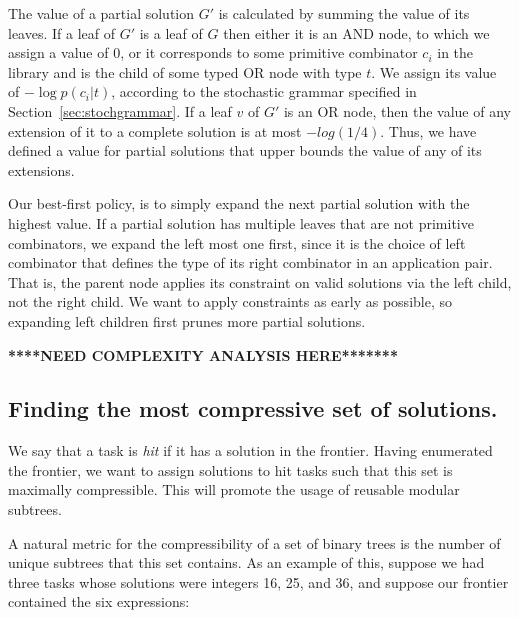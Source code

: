 \documentclass{article}
\begin{document}
The value of a partial solution $G'$ is calculated by summing the
value of its leaves. If a leaf of $G'$ is a leaf of $G$ then either it
is an AND node, to which we assign a value of 0, or it corresponds to
some primitive combinator $c_i$ in the library and is the child of
some typed OR node with type $t$. We assign its value of $- \log{p(c_i
  | t)}$, according to the stochastic grammar specified in
Section~\ref{sec:stochgrammar}. If a leaf $v$ of $G'$ is an OR node,
then the value of any extension of it to a complete solution is at
most $-log(1/4)$. Thus, we have defined a value for partial solutions
that upper bounds the value of any of its extensions. 

Our best-first policy, is to simply expand the next partial solution
with the highest value. If a partial solution has multiple leaves that
are not primitive combinators, we expand the left most one first,
since it is the choice of left combinator that defines the type of its
right combinator in an application pair. That is, the parent node
applies its constraint on valid solutions via the left child, not the
right child. We want to apply constraints as early as possible, so
expanding left children first prunes more partial solutions.

\textbf{****NEED COMPLEXITY ANALYSIS HERE*******}

\subsection{Finding the most compressive set of solutions.}

We say that a task is \emph{hit} if it has a solution in the
frontier. Having enumerated the frontier, we want to assign solutions
to hit tasks such that this set is maximally compressible. This will
promote the usage of reusable modular subtrees. 

A natural metric for the compressibility of a set of binary trees is
the number of unique subtrees that this set contains. As an example of
this, suppose we had three tasks whose solutions were integers 16, 25,
and 36, and suppose our frontier contained the six expressions:

\begin{figure}[h]
\end{figure}
\end{document}
